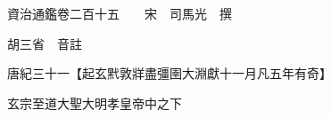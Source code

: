 










 


 
 


 

  
  
  
  
  





  
  
  
  
  
 
  

  

  
  
  



  

 
 

  
   




  

  
  


  　　資治通鑑卷二百十五　　宋　司馬光　撰

　　胡三省　音註

　　唐紀三十一【起玄黓敦牂盡彊圉大淵獻十一月凡五年有奇】

　　玄宗至道大聖大明孝皇帝中之下

